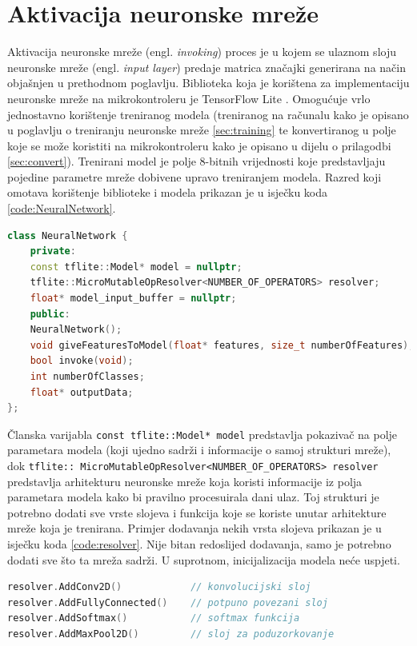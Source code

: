 \section{Aktivacija neuronske mreže}
\label{sec:activation}

Aktivacija neuronske mreže (engl. \textit{invoking}) proces je u kojem se ulaznom sloju neuronske mreže 
(engl. \textit{input layer}) predaje matrica značajki generirana na način objašnjen u prethodnom
poglavlju. Biblioteka koja je korištena za implementaciju
neuronske mreže na mikrokontroleru je TensorFlow Lite \cite{tflm}. Omogućuje vrlo jednostavno
korištenje treniranog modela (treniranog na računalu kako je opisano u poglavlju
o treniranju neuronske mreže \ref{sec:training} te konvertiranog
u polje koje se može koristiti na mikrokontroleru kako je opisano u dijelu
o prilagodbi \ref{sec:convert}). Trenirani model
je polje 8-bitnih vrijednosti koje predstavljaju pojedine parametre mreže dobivene upravo 
treniranjem modela. Razred koji omotava korištenje biblioteke i modela prikazan je 
u isječku koda \ref{code:NeuralNetwork}. 

\begin{lstlisting}[language=C++, caption=Razred neuronske mreže, label=code:NeuralNetwork]
class NeuralNetwork {
    private:
    const tflite::Model* model = nullptr;
    tflite::MicroMutableOpResolver<NUMBER_OF_OPERATORS> resolver;
    float* model_input_buffer = nullptr;
    public:
    NeuralNetwork();
    void giveFeaturesToModel(float* features, size_t numberOfFeatures);
    bool invoke(void);
    int numberOfClasses;
    float* outputData;  
};   
\end{lstlisting}

Članska varijabla \texttt{const tflite::Model* model} predstavlja 
pokazivač na polje parametara modela (koji ujedno sadrži i informacije o samoj strukturi mreže),
dok \texttt{tflite:: MicroMutableOpResolver<NUMBER\_OF\_OPERATORS> resolver}
predstavlja arhitekturu neuronske mreže koja koristi informacije iz polja parametara
modela kako bi pravilno procesuirala dani ulaz. Toj strukturi je potrebno dodati sve vrste slojeva 
i funkcija koje se koriste unutar arhitekture mreže koja je trenirana. Primjer dodavanja 
nekih vrsta slojeva prikazan je u isječku koda \ref{code:resolver}. Nije bitan redoslijed 
dodavanja, samo je potrebno dodati sve što ta mreža sadrži. U suprotnom, inicijalizacija
modela neće uspjeti.

\begin{lstlisting}[language=C++, caption=Gradnja arhitekture mreže, label=code:resolver]
resolver.AddConv2D()            // konvolucijski sloj
resolver.AddFullyConnected()    // potpuno povezani sloj
resolver.AddSoftmax()           // softmax funkcija
resolver.AddMaxPool2D()         // sloj za poduzorkovanje
\end{lstlisting}

